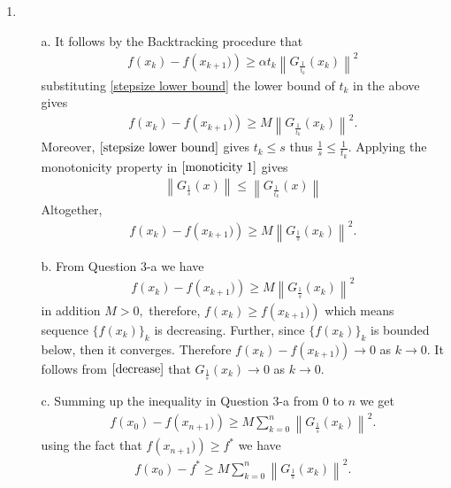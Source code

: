 \documentclass{ExerciseSheet}
\begin{document}
\begin{solution}
\begin{enumerate}
    \item \begin{itemize}
            \item [a.] It follows by the Backtracking procedure that 
            \begin{align*}%
                f(x_k) - f\left(x_{k+1})\right) \geq \alpha t_{k}\left\| G_{\frac{1}{t_k}}(x_k)\right\|^2
            \end{align*}
    substituting \eqref{stepsize lower bound} the lower bound of $t_k$ in the above gives
            \begin{align*}%
                f(x_k) - f\left(x_{k+1})\right) \geq M\left\| G_{\frac{1}{t_k}}(x_k)\right\|^2.
            \end{align*}
   Moreover, $\eqref{stepsize lower bound}$ gives $t_k\leq s$ thus $\frac{1}{s}\leq\frac{1}{t_k}.$ Applying the monotonicity property in $\eqref{monoticity 1}$ gives
             \begin{align*}
            \left\|G_{\frac{1}{s}}(x)\right\| \leq \left\|G_{\frac{1}{t_k}}(x)\right\|
        \end{align*}
     Altogether,
       \begin{align*}%
                f(x_k) - f\left(x_{k+1})\right) \geq M\left\| G_{\frac{1}{s}}(x_k)\right\|^2.
            \end{align*}

    \item [b.] From Question 3-a we have 
                 \begin{align*}%
                f(x_k) - f\left(x_{k+1})\right) \geq M\left\| G_{\frac{1}{s}}(x_k)\right\|^2
            \end{align*}
        in addition $M>0,$ therefore, $f(x_k) \geq f\left(x_{k+1})\right)$ which means sequence $\{f(x_k)\}_k$ is decreasing. Further, since $\{f(x_k)\}_k$ is bounded below, then it converges. Therefore $f(x_k) - f\left(x_{k+1})\right) \to 0$ as $k\to 0.$ It follows from $\eqref{decrease}$ that $G_{\frac{1}{s}}(x_k) \to 0$ as $k\to 0$.    
        
    \item [c.] Summing up the inequality in Question 3-a from 0 to $n$ we get
             \begin{align*}%
                f(x_0) - f\left(x_{n+1})\right) \geq M\sum_{k=0}^{n}\left\| G_{\frac{1}{s}}(x_k)\right\|^2.
            \end{align*}
    using the fact that $f\left(x_{n+1})\right)\geq f^*$ we have 
            \begin{align*}%
                f(x_0) - f^* \geq M\sum_{k=0}^{n}\left\| G_{\frac{1}{s}}(x_k)\right\|^2.
            \end{align*}

            
          \end{itemize}
\end{enumerate}


\end{solution}
\end{document}
